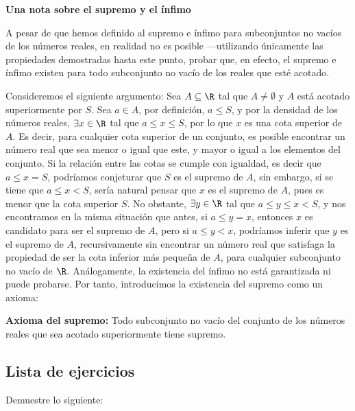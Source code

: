 \textbf{Una nota sobre el supremo y el ínfimo}

A pesar de que hemos definido al supremo e ínfimo para subconjuntos no vacíos de los números reales, en realidad no es posible ---utilizando únicamente las propiedades demostradas hasta este punto, probar que, en efecto, el supremo e ínfimo existen para todo subconjunto no vacío de los reales que esté acotado.

Consideremos el siguiente argumento: Sea $A\subseteq \R$ tal que $A\neq \emptyset$ y $A$ está acotado superiormente por $S$. Sea $a\in A$, por definición, $a\leq S$, y por la densidad de los números reales, $\exists x\in \R$ tal que $a\leq x \leq S$, por lo que $x$ es una cota superior de $A$. Es decir, para cualquier cota superior de un conjunto, es posible encontrar un número real que sea menor o igual que este, y mayor o igual a los elementos del conjunto. Si la relación entre las cotas se cumple con igualdad, es decir que $a\leq x = S$, podríamos conjeturar que $S$ es el supremo de $A$, sin embargo, si se tiene que $a\leq x < S$, sería natural pensar que $x$ es el supremo de $A$, pues es menor que la cota superior $S$. No obstante, $\exists y\in \R$ tal que $a\leq y \leq x<S$, y nos encontramos en la misma situación que antes, si $a\leq y = x$, entonces $x$ es candidato para ser el supremo de $A$, pero si $a\leq y < x$, podríamos inferir que $y$ es el supremo de $A$, recursivamente sin encontrar un número real que satisfaga la propiedad de ser la cota inferior más pequeña de $A$, para cualquier subconjunto no vacío de $\R$. Análogamente, la existencia del ínfimo no está garantizada ni puede probarse. Por tanto, introducimos la existencia del supremo como un axioma:



\textbf{Axioma del supremo:} Todo subconjunto no vacío del conjunto de los números reales que sea acotado superiormente tiene supremo.

\subsection*{Lista de ejercicios}

Demuestre lo siguiente:


